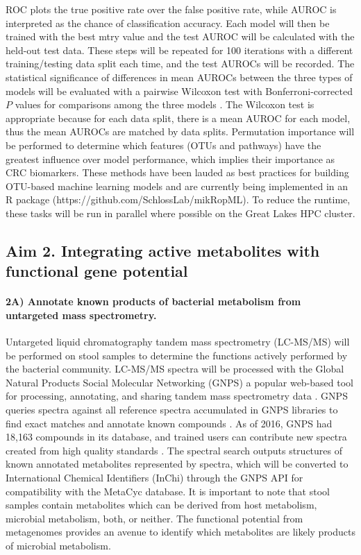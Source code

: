 \documentclass[11pt]{article}
\begin{document}
ROC plots the true positive rate over the false positive rate, while AUROC is interpreted as the chance of classification accuracy.
Each model will then be trained with the best mtry value and the test AUROC will be calculated with the held-out test data.
These steps will be repeated for 100 iterations with a different training/testing data split each time, and the test AUROCs will be recorded.
The statistical significance of differences in mean AUROCs between the three types of models will be evaluated with a pairwise Wilcoxon test with Bonferroni-corrected $P$ values for comparisons among the three models \cite{hannigan_diagnostic_2018}.
The Wilcoxon test is appropriate because for each data split, there is a mean AUROC for each model, thus the mean AUROCs are matched by data splits.
Permutation importance will be performed to determine which features (OTUs and pathways) have the greatest influence over model performance, which implies their importance as CRC biomarkers.
These methods have been lauded as best practices for building OTU-based machine learning models \cite{topcuoglu_framework_2020} and are currently being implemented in an R package (https://github.com/SchlossLab/mikRopML).
To reduce the runtime, these tasks will be run in parallel where possible on the Great Lakes HPC cluster.

\subsection*{Aim 2. Integrating active metabolites with functional gene potential}

\paragraph{2A) Annotate known products of bacterial metabolism from untargeted mass spectrometry.}

Untargeted liquid chromatography tandem mass spectrometry (LC-MS/MS) will be performed on stool samples to determine the functions actively performed by the bacterial community.
LC-MS/MS spectra will be processed with the Global Natural Products Social Molecular Networking (GNPS) a popular web-based tool for processing, annotating, and sharing tandem mass spectrometry data \cite{wang_sharing_2016}.
GNPS queries spectra against all reference spectra accumulated in GNPS libraries to find exact matches and annotate known compounds \cite{aron_reproducible_2020}.
As of 2016, GNPS had 18,163 compounds in its database, and trained users can contribute new spectra created from high quality standards \cite{vargas_protocol_2019}.
The spectral search outputs structures of known annotated metabolites represented by spectra, which will be converted to International Chemical Identifiers (InChi) through the GNPS API for compatibility with the MetaCyc database.
It is important to note that stool samples contain metabolites which can be derived from host metabolism, microbial metabolism, both, or neither.
The functional potential from metagenomes provides an avenue to identify which metabolites are likely products of microbial metabolism.
\end{document}

